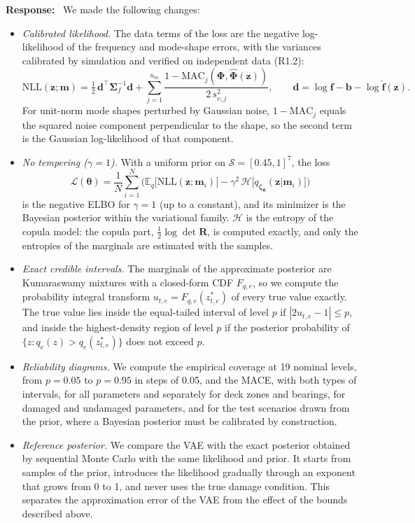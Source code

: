 \documentclass[11pt]{article}
\newenvironment{response}{\par\smallskip\noindent\color{resp}\textbf{Response:}\ }{\par}
\newcommand{\m}{\mathbf{m}}
\newcommand{\z}{\mathbf{z}}
\newcommand{\f}{\mathbf{f}}
\begin{document}
\begin{response}
We made the following changes:
\begin{itemize}[leftmargin=*]
\item \emph{Calibrated likelihood.} The data terms of the loss are the negative log-likelihood of the frequency and
mode-shape errors, with the variances calibrated by simulation and verified on independent data (R1.2):
\begin{equation}
\mathrm{NLL}(\z;\m)=\tfrac12\,\mathbf{d}^{\top}\bm{\Sigma}_f^{-1}\mathbf{d}
+\sum_{j=1}^{n_m}\frac{1-\mathrm{MAC}_j(\bm{\Phi},\hat{\bm{\Phi}}(\z))}{2\,s_{v,j}^2},\qquad
\mathbf{d}=\log\f-\mathbf{b}-\log\hat{\f}(\z).
\label{eq:nll}
\end{equation}
For unit-norm mode shapes perturbed by Gaussian noise, $1-\mathrm{MAC}_j$ equals the squared noise component
perpendicular to the shape, so the second term is the Gaussian log-likelihood of that component.
\item \emph{No tempering ($\gamma=1$).} With a uniform prior on $\mathcal{S}=[0.45,1]^7$, the loss
\begin{equation}
\mathcal{L}(\bm\theta)=\frac1N\sum_{i=1}^N\Big(\mathbb{E}_{q}\big[\mathrm{NLL}(\z;\m_i)\big]
-\gamma^2\,\mathcal{H}\big[q_{\bm\zeta_{\bm\theta}}(\z|\m_i)\big]\Big)
\label{eq:loss}
\end{equation}
is the negative ELBO for $\gamma=1$ (up to a constant), and its minimizer is the Bayesian posterior within the
variational family. $\mathcal{H}$ is the entropy of the copula model: the copula part, $\frac12\log\det\mathbf{R}$, is
computed exactly, and only the entropies of the marginals are estimated with the samples.
\item \emph{Exact credible intervals.} The marginals of the approximate posterior are Kumaraswamy mixtures with a
closed-form CDF $F_{q,e}$, so we compute the probability integral transform $u_{t,e}=F_{q,e}(z^*_{t,e})$ of every true
value exactly. The true value lies inside the equal-tailed interval of level $p$ if $|2u_{t,e}-1|\le p$, and inside the
highest-density region of level $p$ if the posterior probability of $\{z: q_e(z)>q_e(z^*_{t,e})\}$ does not exceed $p$.
\item \emph{Reliability diagrams.} We compute the empirical coverage at 19 nominal levels, from $p=0.05$ to $p=0.95$ in
steps of 0.05, and the MACE, with both types of intervals, for all parameters and separately for deck zones and bearings, for damaged and
undamaged parameters, and for the test scenarios drawn from the prior, where a Bayesian posterior must be calibrated by
construction.
\item \emph{Reference posterior.} We compare the VAE with the exact posterior obtained by sequential Monte Carlo with
the same likelihood and prior. It starts from samples of the prior, introduces the likelihood gradually through an
exponent that grows from 0 to 1, and never uses the true damage condition. This separates the approximation error of
the VAE from the effect of the bounds described above.
\end{itemize}


\end{response}
\end{document}
